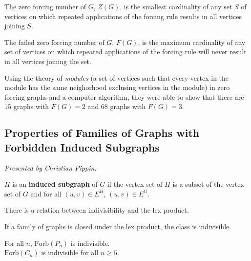 \documentclass[12pt]{amsart}
\begin{document}
\begin{definition}
The zero forcing number of $G$, $Z(G)$, is the smallest cardinality of any set $S$ of vertices on which repeated applications of the forcing rule
results in all vertices joining $S$.
\end{definition}

\begin{definition}
The failed zero forcing number of $G$, $F(G)$, is the maximum
cardinality of any set of vertices on which repeated applications of the forcing rule will never result in all vertices joining the set.\end{definition}

\begin{result*}
Using the theory of \textit{modules} (a set of vertices such that every vertex in the module has the same neighorhood exclusing vertices in the module) in zero forcing graphs and a computer algorithm, they were able to show that
there are $15$ graphs with $F(G) = 2$ and $68$ graphs with $F(G) = 3$. 
\end{result*}

\vspace{2cm}

\subsection{Properties of Families of Graphs with Forbidden Induced Subgraphs}

\textit{}
\vspace{0.25cm}

\textit{Presented by Christian Pippin.}

\begin{definition}
$H$ is an \textbf{induced subgraph} of $G$ if the vertex set of $H$ is a subset of the vertex set of $G$ and for all $(u, v) \in E^{H}$, $(u, v) \in E^G.$
\end{definition}

There is a relation between indivisibility and the lex product. \\

\begin{lemma*}
If a family of graphs is closed under the lex product, the class is indivisible.
\end{lemma*}

\begin{theorem*}
For all $n$, $\mathrm{Forb}(P_n)$ is indivisible. \\

$\mathrm{Forb}(C_n)$ is indivisible for all $n \geq 5.$
\end{theorem*}
\end{document}
